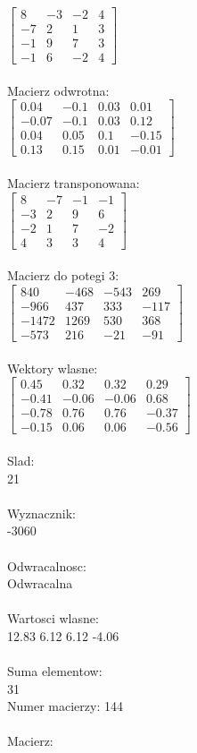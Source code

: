 \documentclass[a4paper,12pt]{article}
\begin{document}
$\begin{bmatrix} 8&-3&-2&4\\-7&2&1&3\\-1&9&7&3\\-1&6&-2&4 \end{bmatrix}$
\\
\\
Macierz odwrotna:\\

$\begin{bmatrix} 0.04&-0.1&0.03&0.01\\-0.07&-0.1&0.03&0.12\\0.04&0.05&0.1&-0.15\\0.13&0.15&0.01&-0.01 \end{bmatrix}$
\\
\\
Macierz transponowana:\\

$\begin{bmatrix} 8&-7&-1&-1\\-3&2&9&6\\-2&1&7&-2\\4&3&3&4 \end{bmatrix}$
\\
\\
Macierz do potegi 3:\\

$\begin{bmatrix} 840&-468&-543&269\\-966&437&333&-117\\-1472&1269&530&368\\-573&216&-21&-91 \end{bmatrix}$
\\
\\
Wektory wlasne:\\

$\begin{bmatrix} 0.45&0.32&0.32&0.29\\-0.41&-0.06&-0.06&0.68\\-0.78&0.76&0.76&-0.37\\-0.15&0.06&0.06&-0.56 \end{bmatrix}$
\\
\\
Slad:\\
21
\\
\\
Wyznacznik:\\
-3060
\\
\\
Odwracalnosc:\\
Odwracalna
\\
\\
Wartosci wlasne:\\
12.83 6.12 6.12 -4.06
\\
\\
Suma elementow:\\
31
\\
\newpage
Numer macierzy:
144
\\
\\
Macierz:\\
\end{document}
